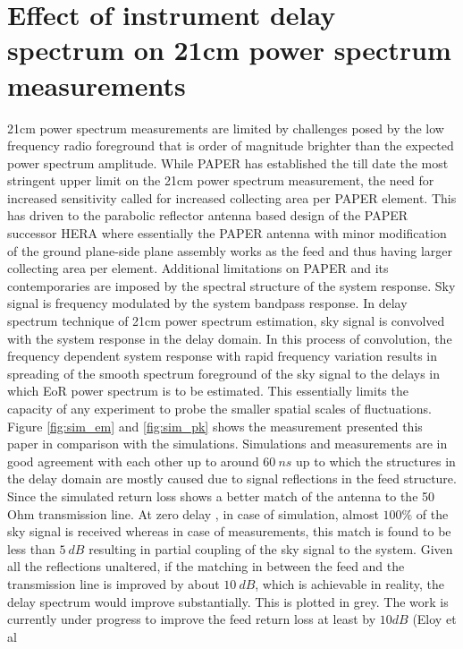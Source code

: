 \documentclass[twocolumn]{emulateapj}
\begin{document}
\section{\textbf{Effect of instrument delay spectrum on 21cm power spectrum measurements}}

21cm power spectrum measurements are limited by challenges posed by the low
frequency radio foreground that is order of magnitude brighter than the
expected power spectrum amplitude. While PAPER has established the till date
the most stringent upper limit on the 21cm power spectrum measurement, the need
for increased sensitivity called for increased collecting area per PAPER
element. This has driven to the parabolic reflector antenna based design of the
PAPER successor HERA where essentially the PAPER antenna with minor
modification of the ground plane-side plane assembly works as the feed and thus
having larger collecting area per element. Additional limitations on PAPER and
its contemporaries are imposed by the spectral structure of the system
response. Sky signal is frequency modulated by the system bandpass response. In
delay spectrum technique of 21cm power spectrum estimation, sky signal is
convolved with the system response in the delay domain. In this process of
convolution, the frequency dependent system response with rapid frequency
variation results in spreading of the smooth spectrum foreground of the sky
signal to the delays in which EoR power spectrum is to be estimated. This
essentially limits the capacity of any experiment to probe the smaller spatial
scales of fluctuations. \\ Figure \ref{fig:sim_em} and \ref{fig:sim_pk} shows
the measurement presented this paper in comparison with the simulations.
Simulations and measurements are in good agreement with each other up to around
$60~ns$ up to which the structures in the delay domain are mostly caused due to
signal reflections in the feed structure. Since the simulated return loss shows
a better match of the antenna to the 50 Ohm transmission line. At zero delay ,
in case of simulation, almost $100\%$ of the sky signal is received whereas in
case of measurements, this match is found to be less than $5~dB$ resulting in
partial coupling of the sky signal to the system. Given all the reflections
unaltered, if the matching in between the feed and the transmission line is
improved by about $10~dB$, which is achievable in reality, the delay spectrum
would improve substantially. This is plotted in grey. The work is currently
under progress to improve the feed return loss at least by  $10dB$ (Eloy et al
\end{document}
